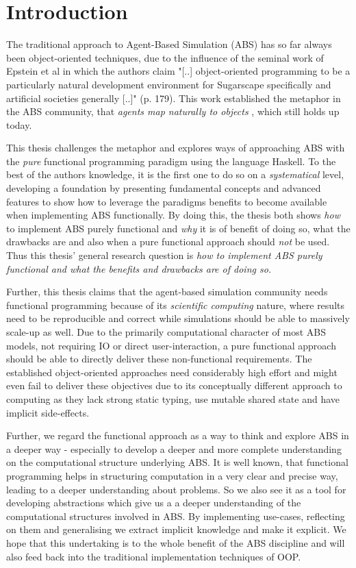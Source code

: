 \chapter{Introduction}
\label{ch:intro}
The traditional approach to Agent-Based Simulation (ABS) has so far always been object-oriented techniques, due to the influence of the seminal work of Epstein et al \cite{epstein_growing_1996} in which the authors claim "[..] object-oriented programming to be a particularly natural development environment for Sugarscape specifically and artificial societies generally [..]" (p. 179). This work established the metaphor in the ABS community, that \textit{agents map naturally to objects} \cite{north_managing_2007}, which still holds up today. %

This thesis challenges the metaphor and explores ways of approaching ABS with the \textit{pure} functional programming paradigm using the language Haskell. To the best of the authors knowledge, it is the first one to do so on a \textit{systematical} level, developing a foundation by presenting fundamental concepts and advanced features to show how to leverage the paradigms benefits \cite{hudak_history_2007} to become available when implementing ABS functionally. By doing this, the thesis both shows \textit{how} to implement ABS purely functional and \textit{why} it is of benefit of doing so, what the drawbacks are and also when a pure functional approach should \textit{not} be used. Thus this thesis' general research question is \textit{how to implement ABS purely functional and what the benefits and drawbacks are of doing so.} 

Further, this thesis claims that the agent-based simulation community needs functional programming because of its \textit{scientific computing} nature, where results need to be reproducible and correct while simulations should be able to massively scale-up as well. Due to the primarily computational character of most ABS models, not requiring IO or direct user-interaction, a pure functional approach should be able to directly deliver these non-functional requirements. The established object-oriented approaches need considerably high effort and might even fail to deliver these objectives due to its conceptually different approach to computing as they lack strong static typing, use mutable shared state and have implicit side-effects. 

Further, we regard the functional approach as a way to think and explore ABS in a deeper way - especially to develop a deeper and more complete understanding on the computational structure underlying ABS. It is well known, that functional programming helps in structuring computation in a very clear and precise way, leading to a deeper understanding about problems. So we also see it as a tool for developing abstractions which give us a a deeper understanding of the computational structures involved in ABS. By implementing use-cases, reflecting on them and generalising we extract implicit knowledge and make it explicit. We hope that this undertaking is to the whole benefit of the ABS discipline and will also feed back into the traditional implementation techniques of OOP.

